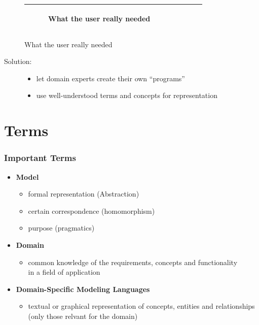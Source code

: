 \documentclass[11 pt,t]{beamer}
\begin{document}
\begin{frame}
\begin{figure}[h]
\begin{center}
{\begin{tabular}{|c|c|c|c|c|}
\begin{subfigure}[t]{0.15\textwidth}
\caption*{\tiny \centering What the user really needed}\label{fig:whatneeded}\end{subfigure}\\
\hline
\end{tabular}}
\label{fig:swingexample}
\end{center}
\end{figure}

\begin{description}
  \item [Solution:] 
  \begin{itemize}
     \item let domain experts create their own ``programs''
     \item use well-understood terms and concepts for representation
    \end{itemize}
\end{description}
\end{frame}

\section{Terms}
\begin{frame}
\vspace{.5cm}
  \frametitle{Important Terms}
  \begin{itemize}
    \item \textbf{Model}
      \begin{itemize}
       \item formal representation (Abstraction)
       \item certain correspondence (homomorphism)
       \item purpose (pragmatics)
      \end{itemize}
      
    \item \textbf{Domain}
      \begin{itemize}
       \item common knowledge of the requirements, concepts and functionality 
	    \\in a field of application
      \end{itemize}

    \item \textbf{Domain-Specific Modeling Languages}
    \begin{itemize}
       \item textual or graphical representation of concepts, entities and relationships
	      (only those relvant for the domain)
      \end{itemize}

  \end{itemize}
\end{frame}
\end{document}
